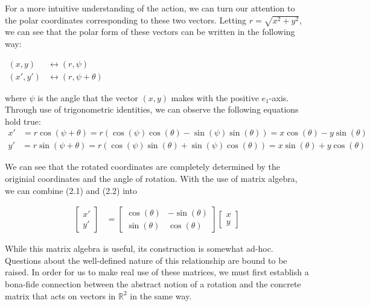 \documentclass[10pt]{ucthesis}
\newcommand{\R}{\mathbb{R}}
\begin{document}
For a more intuitive understanding of the action, we can turn our attention to the polar coordinates corresponding to these two vectors. Letting $r = \sqrt{x^2 + y^2}$, we can see that the polar form of these vectors can be written in the following way:
\begin{center}
	$\begin{aligned}
		(x,y) &\leftrightarrow (r,\psi)\\
		(x',y') &\leftrightarrow (r,\psi+\theta)
	\end{aligned}$
\end{center}
where $\psi$ is the angle that the vector $(x,y)$ makes with the positive $e_1$-axis. Through use of trigonometric identities, we can observe the following equations hold true:
\begin{equation}
	\begin{aligned}
		x' &= r\cos(\psi+\theta) = r\left(\cos(\psi)\cos(\theta) - \sin(\psi)\sin(\theta)\right) = x\cos(\theta) -y\sin(\theta)
	\end{aligned}
\end{equation}
\begin{equation}
	\begin{aligned}
		y' &= r\sin(\psi+\theta) = r\left(\cos(\psi)\sin(\theta) + \sin(\psi)\cos(\theta)\right) = x\sin(\theta) +y\cos(\theta)
	\end{aligned}
\end{equation}

We can see that the rotated coordinates are completely determined by the originial coordinates and the angle of rotation. With the use of matrix algebra, we can combine (2.1) and (2.2) into 

\begin{equation}
	\begin{aligned}
		\begin{bmatrix}
			x' \\
			y'
		\end{bmatrix} &=
		\begin{bmatrix}
			\cos(\theta) & -\sin(\theta) \\
			\sin(\theta) & \cos(\theta)
		\end{bmatrix}
		\begin{bmatrix}
			x \\
			y
		\end{bmatrix}
	\end{aligned}
\end{equation}

While this matrix algebra is useful, its construction is somewhat ad-hoc. Questions about the well-defined nature of this relationship are bound to be raised. In order for us to make real use of these matrices, we must first establish a bona-fide connection between the abstract notion of a rotation and the concrete matrix that acts on vectors in $\R^2$ in the same way.
\end{document}
